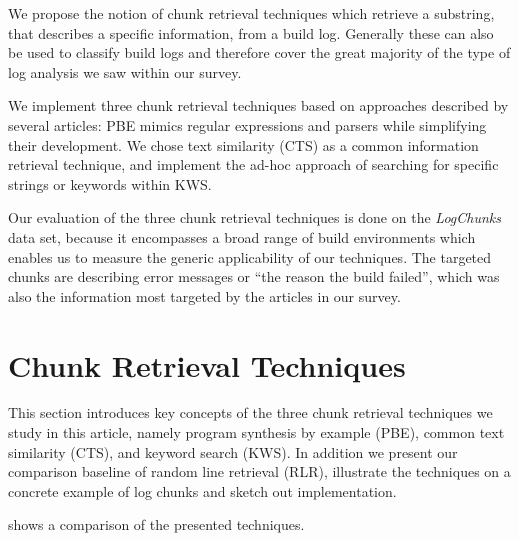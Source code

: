 We propose the notion of chunk retrieval techniques which retrieve
a substring, that describes a specific information, from a build log.
Generally these can also be used to classify build logs and therefore
cover the great majority of the type of log analysis we saw within
our survey.

We implement three chunk retrieval techniques based on approaches
described by several articles:
PBE mimics regular expressions and parsers while simplifying
their development.
We chose text similarity (CTS) as a common information retrieval
technique, and implement the ad-hoc approach of
searching for specific strings or keywords within KWS\@.

Our evaluation of the three chunk retrieval techniques is done on the
\emph{LogChunks} data set, because it encompasses a broad range of
build environments which enables us to measure the generic
applicability of our techniques.
The targeted chunks are describing error messages or
``the reason the build failed'', which was also the information
most targeted by the articles in our survey.


\section{Chunk Retrieval Techniques}
\label{sec:techniques}
This section introduces key concepts of the three chunk retrieval
techniques we study in this article, namely program synthesis by
example (PBE), common text similarity (CTS), and keyword search (KWS).
In addition we present our comparison baseline of random line
retrieval (RLR), illustrate the techniques on a concrete example
of log chunks and sketch out implementation.

 shows a comparison of the presented techniques.

